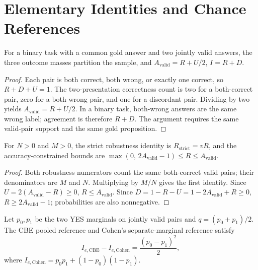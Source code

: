 \section{Elementary Identities and Chance References}
\label{app:identities}

\begin{proposition}
For a binary task with a common gold answer and two jointly valid answers, the three outcome masses
partition the sample, and $A_{\mathrm{valid}} = R + U/2$, $I = R + D$.
\end{proposition}

\begin{proof}
Each pair is both correct, both wrong, or exactly one correct, so $R + D + U = 1$. The two-presentation
correctness count is two for a both-correct pair, zero for a both-wrong pair, and one for a discordant pair.
Dividing by two yields $A_{\mathrm{valid}} = R + U/2$. In a binary task, both-wrong answers are the same
wrong label; agreement is therefore $R + D$. The argument requires the same valid-pair support and the same
gold proposition.
\end{proof}

\begin{proposition}
For $N > 0$ and $M > 0$, the strict robustness identity is $R_{\mathrm{strict}} = vR$, and the
accuracy-constrained bounds are $\max(0,\, 2A_{\mathrm{valid}} - 1) \le R \le A_{\mathrm{valid}}$.
\end{proposition}

\begin{proof}
Both robustness numerators count the same both-correct valid pairs; their denominators are $M$ and $N$.
Multiplying by $M/N$ gives the first identity. Since $U = 2(A_{\mathrm{valid}} - R) \ge 0$,
$R \le A_{\mathrm{valid}}$. Since $D = 1 - R - U = 1 - 2A_{\mathrm{valid}} + R \ge 0$,
$R \ge 2A_{\mathrm{valid}} - 1$; probabilities are also nonnegative.
\end{proof}

\begin{proposition}
Let $p_0, p_1$ be the two YES marginals on jointly valid pairs and $q = (p_0 + p_1)/2$. The CBE pooled
reference and Cohen's separate-marginal reference satisfy
\begin{equation}
  I_{e,\mathrm{CBE}} - I_{e,\mathrm{Cohen}} = \frac{(p_0 - p_1)^2}{2},
  \label{eq:cohen}
\end{equation}
where $I_{e,\mathrm{Cohen}} = p_0 p_1 + (1 - p_0)(1 - p_1)$.
\end{proposition}

